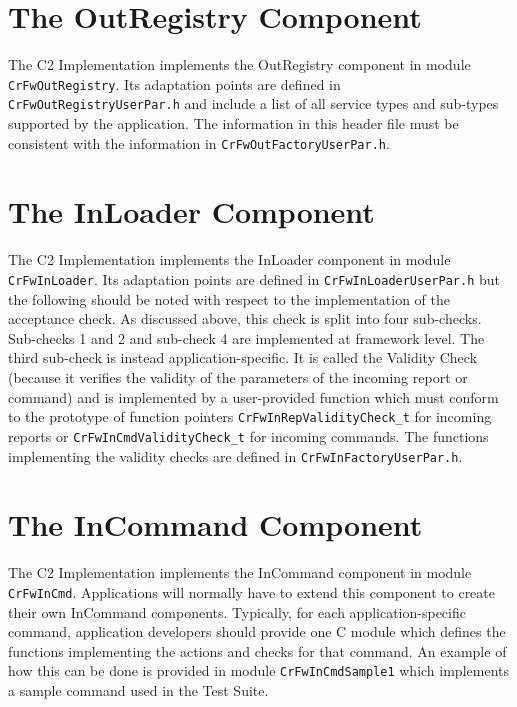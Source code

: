 \documentclass[a4paper,10pt]{article}
\let\stdsection\section
\renewcommand\section{\newpage\stdsection}
\begin{document}
\section{The OutRegistry Component}\label{sec:OutRegistry}


The C2 Implementation implements the OutRegistry component in module \texttt{CrFwOutRegistry}. Its adaptation points are defined in \texttt{CrFwOutRegistryUserPar.h} and include a list of all service types and sub-types supported by the application. The information in this header file must be consistent with the information in \texttt{CrFwOutFactoryUserPar.h}.

\clearpage
\section{The InLoader Component}\label{sec:InLoader}


The C2 Implementation implements the InLoader component in module \texttt{CrFwInLoader}. Its adaptation points are defined in \texttt{CrFwInLoaderUserPar.h} but the following should be noted with respect to the implementation of the acceptance check. As discussed above, this check is split into four sub-checks. Sub-checks 1 and 2 and sub-check 4 are implemented at framework level. The third sub-check is instead application-specific. It is called the Validity Check (because it verifies the validity of the parameters of the incoming report or command) and is implemented by a user-provided function which must conform to the prototype of function pointers \texttt{CrFwInRepValidityCheck\_t} for incoming reports or \texttt{CrFwInCmdValidityCheck\_t} for incoming commands. The functions implementing the validity checks are defined in \texttt{CrFwInFactoryUserPar.h}.

\section{The InCommand Component}\label{sec:InCommand}


The C2 Implementation implements the InCommand component in module \texttt{CrFwInCmd}. Applications will normally have to extend this component to create their own InCommand components. Typically, for each application-specific command, application developers should provide one C module which defines the functions implementing the actions and checks for that command. An example of how this can be done is provided in module \texttt{CrFwInCmdSample1} which implements a sample command used in the Test Suite.
\end{document}
